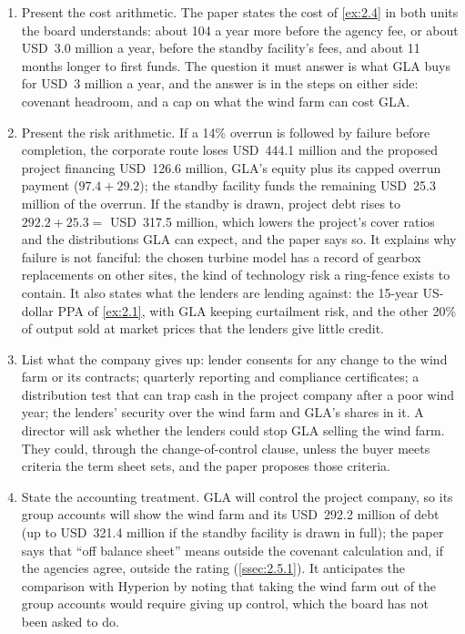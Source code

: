 \begin{enumerate}
\item Present the cost arithmetic. The paper states the cost of \cref{ex:2.4} in both units the board understands: about 104\bps{} a year more before the agency fee, or about USD~3.0 million a year, before the standby facility's fees, and about 11 months longer to first funds. The question it must answer is what GLA buys for USD~3 million a year, and the answer is in the steps on either side: covenant headroom, and a cap on what the wind farm can cost GLA.

\item Present the risk arithmetic. If a 14\% overrun is followed by failure before completion, the corporate route loses USD~444.1 million and the proposed project financing USD~126.6 million, GLA's equity plus its capped overrun payment ($97.4 + 29.2$); the standby facility funds the remaining USD~25.3 million of the overrun. If the standby is drawn, project debt rises to $292.2 + 25.3 = $ USD~317.5 million, which lowers the project's cover ratios and the distributions GLA can expect, and the paper says so. It explains why failure is not fanciful: the chosen turbine model has a record of gearbox replacements on other sites, the kind of technology risk a ring-fence exists to contain. It also states what the lenders are lending against: the 15-year US-dollar PPA of \cref{ex:2.1}, with GLA keeping curtailment risk, and the other 20\% of output sold at market prices that the lenders give little credit.

\item List what the company gives up: lender consents for any change to the wind farm or its contracts; quarterly reporting and compliance certificates; a distribution test that can trap cash in the project company after a poor wind year; the lenders' security over the wind farm and GLA's shares in it. A director will ask whether the lenders could stop GLA selling the wind farm. They could, through the change-of-control clause, unless the buyer meets criteria the term sheet sets, and the paper proposes those criteria.

\item State the accounting treatment. GLA will control the project company, so its group accounts will show the wind farm and its USD~292.2 million of debt (up to USD~321.4 million if the standby facility is drawn in full); the paper says that ``off balance sheet'' means outside the covenant calculation and, if the agencies agree, outside the rating (\cref{ssec:2.5.1}). It anticipates the comparison with Hyperion by noting that taking the wind farm out of the group accounts would require giving up control, which the board has not been asked to do.


\end{enumerate}
